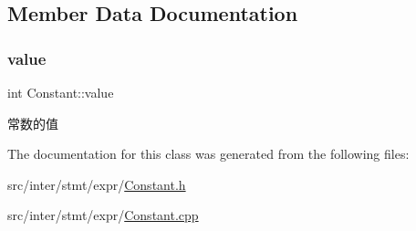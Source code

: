 \subsection{Member Data Documentation}
\mbox{\label{class_constant_a132c9bc0ec98681bcbf723d87ddd722d}} 
\subsubsection{\texorpdfstring{value}{value}}
{\footnotesize\ttfamily int Constant\+::value}

常数的值 

The documentation for this class was generated from the following files\+:\begin{DoxyCompactItemize}
\item 
src/inter/stmt/expr/\hyperlink{_constant_8h}{Constant.\+h}\item 
src/inter/stmt/expr/\hyperlink{_constant_8cpp}{Constant.\+cpp}\end{DoxyCompactItemize}
